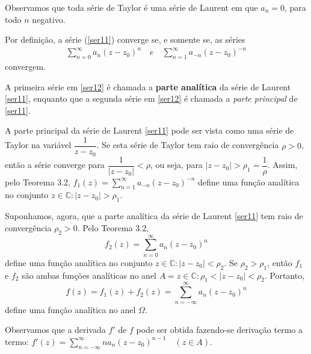 Observamos que toda série de Taylor é uma série de Laurent em que $a_n = 0$, para todo $n$ negativo.

Por definição, a série (\eqref{ser11}) converge se, e somente se, as séries
\begin{eqnarray}\label{ser12}
\displaystyle\sum_{n=0}^{\infty} a_n(z-z_0)^n \quad e \quad \displaystyle\sum_{n=1}^{\infty} a_{-n}(z-z_0)^{-n}
\end{eqnarray}
convergem.

A primeira série em \eqref{ser12} é chamada a \textbf{parte analítica} da série de Laurent \eqref{ser11}, enquanto que a segunda série em \eqref{ser12} é chamada a \textit{parte principal} de \eqref{ser11}.

A parte principal da série de Laurent \eqref{ser11} pode ser vista como uma série de Taylor na variável $\dfrac{1}{z-z_0}$.
Se esta série de Taylor tem raio de convergência $\rho > 0$, então a série converge para $\dfrac{1}{|z-z_0|}<\rho$, ou seja, para $|z-z_0|>\rho_1 = \dfrac{1}{\rho}$. Assim, pelo Teorema 3.2,
$f_1(z) = \displaystyle\sum_{n=1}^{\infty} a_{-n}(z-z_0)^{-n}$
define uma função analítica no conjunto ${z \in \mathbb{C}: |z-z_0|>\rho_1}$.

Suponhamos, agora, que a parte analítica da série de Laurent \eqref{ser11} tem raio de convergência $\rho_2 > 0$. Pelo Teorema 3.2,
$$f_2(z) = \displaystyle\sum_{n=0}^{\infty} a_n(z-z_0)^n$$
define uma função analítica no conjunto ${z \in \mathbb{C}: |z-z_0|<\rho_2}$. Se $\rho_2>\rho_1$, então $f_1$ e $f_2$ são ambas funções analíticas no anel $A = {z \in \mathbb{C}: \rho_1 <|z-z_0|<\rho_2}$. Portanto,
$$f(z) = f_1(z) + f_2(z) = \displaystyle\sum_{n=-\infty}^{\infty} a_n(z-z_0)^n$$
define uma função analítica no anel $\Omega$.

Observamos que a derivada $f'$ de $f$ pode ser obtida fazendo-se derivação termo a termo:
$f'(z) = \displaystyle\sum_{n=-\infty}^{\infty} na_n(z-z_0)^{n-1} \quad (z \in A)$.

